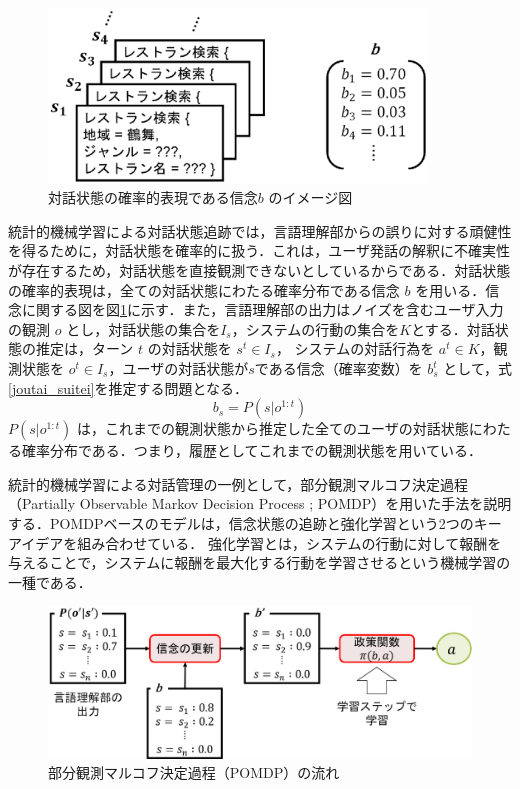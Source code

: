 \begin{figure}[thb]
  \begin{center}
    \includegraphics[width=10cm]{chapter2/belief.eps}
    \caption{対話状態の確率的表現である信念$b$ のイメージ図}
    \label{fig:belief}
  \end{center}
\end{figure}

統計的機械学習による対話状態追跡では，言語理解部からの誤りに対する頑健性を得るために，対話状態を確率的に扱う．これは，ユーザ発話の解釈に不確実性が存在するため，対話状態を直接観測できないとしているからである．対話状態の確率的表現は，全ての対話状態にわたる確率分布である信念 $b$ を用いる．信念に関する図を図\ref{fig:belief}に示す．また，言語理解部の出力はノイズを含むユーザ入力の観測 $o$ とし，対話状態の集合を$I_s$，システムの行動の集合を$K$とする．対話状態の推定は，ターン $t$ の対話状態を $s^t \in I_s$，
システムの対話行為を $a^t \in K$，観測状態を $o^t \in I_s$，ユーザの対話状態が$s$である信念（確率変数）を $b^t_s$ として，式\ref{joutai_suitei}を推定する問題となる．
\begin{equation}
  \label{joutai_suitei}
  b_s = P(s|o^{1:t})
\end{equation}
$P(s|o^{1:t})$ は，これまでの観測状態から推定した全てのユーザの対話状態にわたる確率分布である．つまり，履歴としてこれまでの観測状態を用いている．
\par
統計的機械学習による対話管理の一例として，部分観測マルコフ決定過程（Partially Observable Markov Decision Process ; POMDP）\cite{pomdp,pomdp_review}を用いた手法を説明する．POMDPベースのモデルは，信念状態の追跡と強化学習という2つのキーアイデアを組み合わせている\cite{pomdp_review}．
強化学習とは，システムの行動に対して報酬を与えることで，システムに報酬を最大化する行動を学習させるという機械学習の一種である．
\par

\begin{figure}[thb]
  \begin{center}
    \includegraphics[width=15cm]{chapter2/pomdp2.eps}
    \caption{部分観測マルコフ決定過程（POMDP）の流れ}
    \label{fig:pomdp}
  \end{center}
\end{figure}


